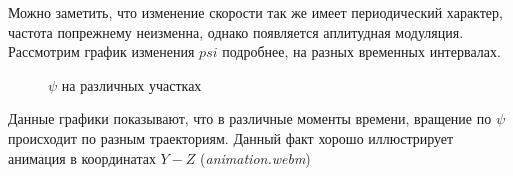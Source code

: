 \documentclass[a4paper, 12pt]{article}
\begin{document}
    Можно заметить, что изменение скорости так же имеет периодический характер, частота попрежнему неизменна, однако появляется аплитудная модуляция. Рассмотрим график изменения $psi$ подробнее, на разных временных интервалах.
    
    \begin{figure}[H]%
        \centering
        \qquad
        \qquad
        \newline
        \centering
        \qquad
        \caption{$\psi$ на различных участках}%
        \label{psi}%
    \end{figure}
    Данные графики показывают, что в различные моменты времени, вращение по $\psi$ происходит по разным траекториям.
    Данный факт хорошо иллюстрирует анимация в координатах $Y-Z$ (\textit{animation.webm})
    
\end{document}
